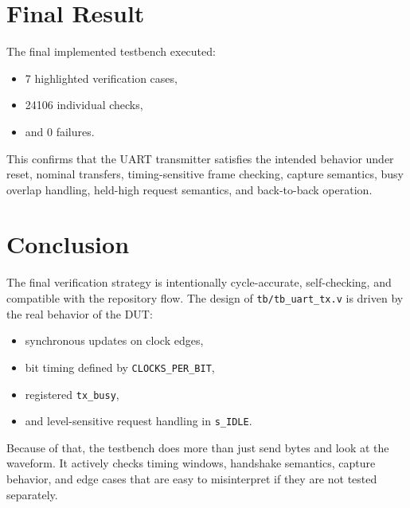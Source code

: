 \documentclass[12pt]{article}
\begin{document}
\section{Final Result}

The final implemented testbench executed:

\begin{itemize}
    \item 7 highlighted verification cases,
    \item 24106 individual checks,
    \item and 0 failures.
\end{itemize}

This confirms that the UART transmitter satisfies the intended behavior under
reset, nominal transfers, timing-sensitive frame checking, capture semantics,
busy overlap handling, held-high request semantics, and back-to-back operation.

\section{Conclusion}

The final verification strategy is intentionally cycle-accurate, self-checking,
and compatible with the repository flow. The design of \texttt{tb/tb\_uart\_tx.v}
is driven by the real behavior of the DUT:

\begin{itemize}
    \item synchronous updates on clock edges,
    \item bit timing defined by \texttt{CLOCKS\_PER\_BIT},
    \item registered \texttt{tx\_busy},
    \item and level-sensitive request handling in \texttt{s\_IDLE}.
\end{itemize}

Because of that, the testbench does more than just send bytes and look at the
waveform. It actively checks timing windows, handshake semantics, capture
behavior, and edge cases that are easy to misinterpret if they are not tested
separately.
\end{document}
